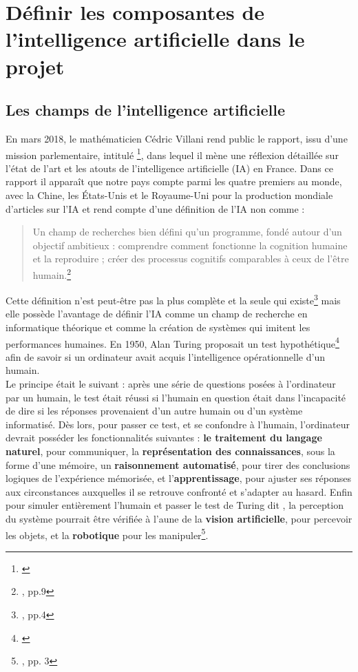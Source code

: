 \section{Définir les composantes de l'intelligence artificielle dans le projet}

\subsection{Les champs de l'intelligence artificielle}

En mars 2018, le mathématicien Cédric Villani rend public le rapport, issu d'une mission parlementaire, intitulé \footnote{\cite{noauthor_rapport_nodate}}, dans lequel il mène une réflexion détaillée sur l'état de l'art et les atouts de l'intelligence artificielle (IA) en France. Dans ce rapport il apparaît que notre pays compte parmi les quatre premiers au monde, avec la Chine, les États-Unis et le Royaume-Uni pour la production mondiale d'articles sur l'IA et rend compte d'une définition de l'IA non comme :
\begin{quote}
    Un champ de recherches bien défini qu'un programme, fondé autour d'un objectif ambitieux : comprendre comment fonctionne la cognition humaine et la reproduire ; créer des processus cognitifs comparables à ceux de l'être humain.\footnote{\cite{noauthor_rapport_nodate}, pp.9}
\end{quote}
Cette définition n'est peut-être pas la plus complète et la seule qui existe\footnote{\cite{russell_intelligence_2010}, pp.4} mais elle possède l'avantage de définir l'IA comme un champ de recherche en informatique théorique et comme la création de systèmes qui imitent les performances humaines. En 1950, Alan Turing proposait un test hypothétique\footnote{\cite{turing_computing_1950}} afin de savoir si un ordinateur avait acquis l'intelligence opérationnelle d'un humain.\\ 

Le principe était le suivant : après une série de questions posées à l'ordinateur par un humain, le test était réussi si l'humain en question était dans l'incapacité de dire si les réponses provenaient d'un autre humain ou d'un système informatisé. Dès lors, pour passer ce test, et se confondre à l'humain, l'ordinateur devrait posséder les fonctionnalités suivantes : \textbf{le traitement du langage naturel}, pour communiquer, la \textbf{représentation des connaissances}, sous la forme d'une mémoire, un \textbf{raisonnement automatisé}, pour tirer des conclusions logiques de l'expérience mémorisée, et l'\textbf{apprentissage}, pour ajuster ses réponses aux circonstances auxquelles il se retrouve confronté et s'adapter au hasard. Enfin pour simuler entièrement l'humain et passer le test de Turing dit , la perception du système pourrait être vérifiée à l'aune de la \textbf{vision artificielle}, pour percevoir les objets, et la \textbf{robotique} pour les manipuler\footnote{\cite{russell_intelligence_2010}, pp. 3}.\\

